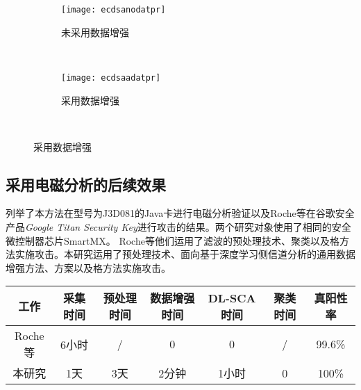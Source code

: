 {{	
	\begin{figure}[!h]
		\centering
		\begin{subfigure}[b]{\twof\textwidth}
			\texttt{[image: ecdsanodatpr]}
			\caption{未采用数据增强}
			\label{fig:ecdsanodatpr}
		\end{subfigure}%
		~%
		\begin{subfigure}[b]{\twof\textwidth}
			\texttt{[image: ecdsaadatpr]}
			\caption{采用数据增强}
			\label{fig:ecdsaadatpr}
		\end{subfigure}
		\\
		\label{fig:ecdsatpr}
	\end{figure}
	
	
	\subsection{采用电磁分析的后续效果}
	{\color{\xchange}
	
	列举了本方法在型号为J3D081的Java卡进行电磁分析验证以及Roche等\citep{Roche21}在谷歌安全产品\textit{Google Titan Security Key}\citep{Titan}进行攻击的结果。两个研究对象使用了相同的安全微控制器芯片SmartMX\citep{p5x}。%
	Roche等\citep{Roche21}他们运用了滤波的预处理技术、聚类以及格方法实施攻击。本研究运用了\yuchuli 预处理技术、面向基于深度学习侧信道分析的通用数据增强方法、\jiashejianyanguji 方案以及格方法实施攻击。
	
	\begin{table}[!h]
		\label{tab:improve}
		\centering
		\tiny%
		\begin{tabular}{c|cccccc}
			\hline
			工作&采集时间&预处理时间&数据增强时间&DL-SCA时间&聚类时间&真阳性率\\
			\hline
			Roche等\citep{Roche21}&6小时&/&0&0&/&99.6\%\\
			本研究&1天&3天&2分钟&1小时&0&100\%\\
			\hline
		\end{tabular}
	\end{table}

}}}

